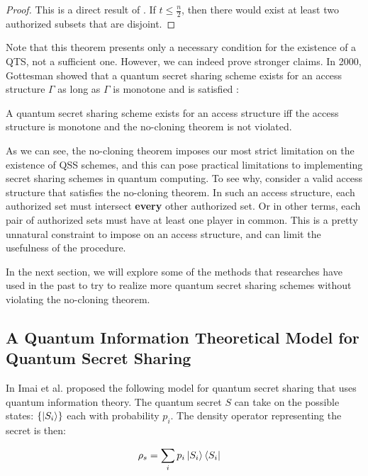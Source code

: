 \begin{proof}
    This is a direct result of . If $t \leq \frac{n}{2}$, then there would exist at least two authorized subsets that are disjoint. 
\end{proof}

Note that this theorem presents only a necessary condition for the existence of a QTS, not a sufficient one. However, we can indeed prove stronger claims. In 2000, Gottesman showed that a quantum secret sharing scheme exists for an access structure $\Gamma$ as long as $\Gamma$ is monotone and  is satisfied \cite{gottesman_theory_2000}:

\begin{theorem}
    \label{thm:monotone-gamma}
    A quantum secret sharing scheme exists for an access structure iff the access structure is monotone and the no-cloning theorem is not violated.
\end{theorem}

As we can see, the no-cloning theorem imposes our most strict limitation on the existence of QSS schemes, and this can pose practical limitations to implementing secret sharing schemes in quantum computing. To see why, consider a valid access structure that satisfies the no-cloning theorem. In such an access structure, each authorized set must intersect \textbf{every} other authorized set. Or in other terms, each pair of authorized sets must have at least one player in common. This is a pretty unnatural constraint to impose on an access structure, and can limit the usefulness of the procedure.

In the next section, we will explore some of the methods that researches have used in the past to try to realize more quantum secret sharing schemes without violating the no-cloning theorem.

\subsection{A Quantum Information Theoretical Model for Quantum Secret Sharing}

In \cite{imai_quantum_2003} Imai et al. proposed the following model for quantum secret sharing that uses quantum information theory. The quantum secret $S$ can take on the possible states: $\{\ket{S_i}\}$ each with probability $p_i$. The density operator representing the secret is then:

\begin{align}
    \rho_s &= \sum_i p_i \ket{S_i} \bra{S_i}
\end{align}

